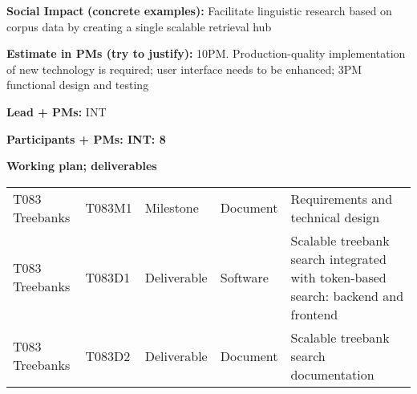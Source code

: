 \textbf{Social Impact} \textbf{(concrete examples):} Facilitate
linguistic research based on corpus data by creating a single scalable
retrieval hub

\textbf{Estimate in PMs (try to justify):} 10PM. Production-quality
implementation of new technology is required; user interface needs to be
enhanced; 3PM functional design and testing

\textbf{Lead + PMs:} INT

\textbf{Participants + PMs: INT: 8}

\textbf{Working plan; deliverables }

\begin{longtable}[c]{@{}lllll@{}}
\toprule
T083 Treebanks & T083M1 & Milestone & Document & Requirements and
technical design\tabularnewline
T083 Treebanks & T083D1 & Deliverable & Software & Scalable treebank
search integrated with token-based search: backend and
frontend\tabularnewline
T083 Treebanks & T083D2 & Deliverable & Document & Scalable treebank
search documentation\tabularnewline
\bottomrule
\end{longtable}
